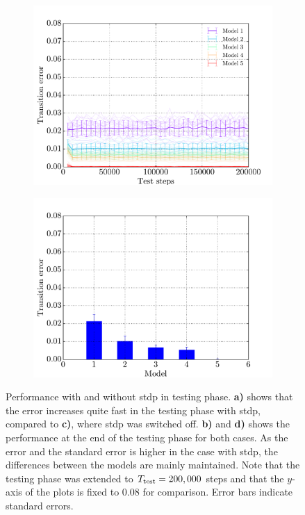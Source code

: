 \begin{figure}[!b]
\begin{subfigure}{0.48\textwidth}
    	\centering
        \includegraphics[width=\textwidth]{appendix/stdp_without_test_traces_distances}
        \caption{}
        \label{fig:stdp-without-test}
    \end{subfigure}
    \hfill
    \begin{subfigure}{0.48\textwidth}
    	\centering
        \includegraphics[width=\textwidth]{appendix/stdp_without_performance_distances}
        \caption{}
        \label{fig:stdp-without-perf}
    \end{subfigure}
    \caption[Performance with and without STDP in testing phase]{Performance with and without \acs{stdp} in testing phase. \textbf{a)} shows that the error increases quite fast in the testing phase with \acs{stdp}, compared to \textbf{c)}, where \acs{stdp} was switched off. \textbf{b)} and \textbf{d)} shows the performance at the end of the testing phase for both cases. As the error and the standard error is higher in the case with \acs{stdp}, the differences between the models are mainly maintained. Note that the testing phase was extended to $T_{\text{test}} = 200,000$ steps and that the $y$-axis of the plots is fixed to $0.08$ for comparison. Error bars indicate standard errors.}
    \label{fig:stdp-with-without}
\end{figure}

